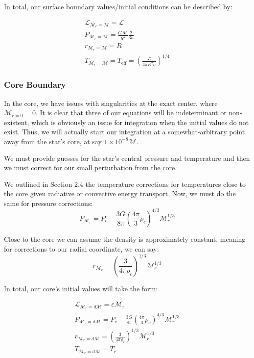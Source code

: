 \documentclass[twocolumn]{aastex631}
\begin{document}
In total, our surface boundary values/initial conditions can be described by:

\begin{equation}
\boxed{
\begin{array}{lcl}
\mathcal{L}_{\mathcal{M}_r=\mathcal{M}} = \mathcal{L}\\
P_{\mathcal{M}_r=\mathcal{M}} = \frac{G\mathcal{M}}{R^2}\frac{2}{3\kappa}\\
r_{\mathcal{M}_r=\mathcal{M}} = R\\
T_{\mathcal{M}_r=\mathcal{M}} = T_\text{eff} = \left(\frac{\mathcal{L}}{4\pi R^2 \sigma}\right)^{1/4}
\end{array}
}
\end{equation}


\subsubsection{Core Boundary}

In the core, we have issues with singularities at the exact center, where $\mathcal{M}_{r=0} = 0$. It is clear that three of our equations will be indeterminant or non-existent, which is obviously an issue for integration when the initial values do not exist. Thus, we will actually start our integration at a somewhat-arbitrary point away from the star's core, at say $1\times 10^{-8} \mathcal{M}$. 

We must provide guesses for the star's central pressure and temperature and then we must correct for our small perturbation from the core.

We outlined in Section 2.4 the temperature corrections for temperatures close to the core given radiative or convective energy transport. Now, we must do the same for pressure corrections:
\begin{equation}
	P_{\mathcal{M}_r} = P_c - \frac{3G}{8\pi}\left(\frac{4\pi}{3}\rho_c\right)^{4/3}\mathcal{M}_r^{1/3}
\end{equation}

Close to the core we can assume the density is approximately constant, meaning for corrections to our radial coordinate, we can say:
\begin{equation}
	r_{\mathcal{M}_r} = \left(\frac{3}{4\pi \rho_c}\right)^{1/3}\mathcal{M}_r^{1/3}
\end{equation}

In total, our core's initial values will take the form:

\begin{equation}
\boxed{
\begin{array}{lcl}
\mathcal{L}_{\mathcal{M}_r=d\mathcal{M}} = \varepsilon \mathcal{M}_r\\
P_{\mathcal{M}_r=d\mathcal{M}} = P_c - \frac{3G}{8\pi}\left(\frac{4\pi}{3}\rho_c\right)^{4/3}\mathcal{M}_r^{1/3}\\
r_{\mathcal{M}_r=d\mathcal{M}} = \left(\frac{3}{4\pi \rho_c}\right)^{1/3}\mathcal{M}_r^{1/3}\\
T_{\mathcal{M}_r=d\mathcal{M}} = T_r
\end{array}
}
\end{equation}
\end{document}
